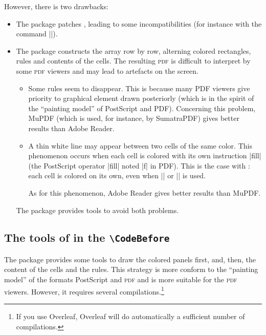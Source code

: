\documentclass[dvipsnames]{article}
\begin{document}
\medskip
However, there is two drawbacks:
\begin{itemize}
\item The package  patches , leading to some
incompatibilities (for instance with the command |\hdotsfor|).

\item The package  constructs the array row by row, alterning
colored rectangles, rules and contents of the cells. The resulting
\textsc{pdf} is difficult to interpret by some \textsc{pdf} viewers and may
lead to artefacts on the screen.
\begin{itemize}
\item Some rules seem to disappear. This is because many PDF viewers give
priority to graphical element drawn posteriorly (which is in the spirit of the
``painting model'' of PostScript and PDF). Concerning this problem, MuPDF
(which is used, for instance, by SumatraPDF) gives better results than Adobe
Reader.
\item A thin white line may appear between two cells of the same color. This
phenomenon occurs when each cell is colored with its own instruction |fill|
(the PostScript operator |fill| noted |f| in PDF). This is the case with
: each cell is colored on its own, even when |\columncolor| or
|\rowcolor| is used.

As for this phenomenon, Adobe Reader gives better results than MuPDF.
\end{itemize}

The package  provides tools to avoid both problems.
\end{itemize}

\subsection{The tools of \texorpdfstring{}{nicematrix} in the \texttt{\textbackslash CodeBefore}}

\label{color-in-code-before}

The package  provides some tools to draw the colored panels
first, and, then, the content of the cells and the rules. This strategy is more
conform to the ``painting model'' of the formats PostScript and \textsc{pdf} and
is more suitable for the \textsc{pdf} viewers. However, it requires several
compilations.\footnote{If you use Overleaf, Overleaf will do automatically a
  sufficient number of compilations.}
\end{document}
